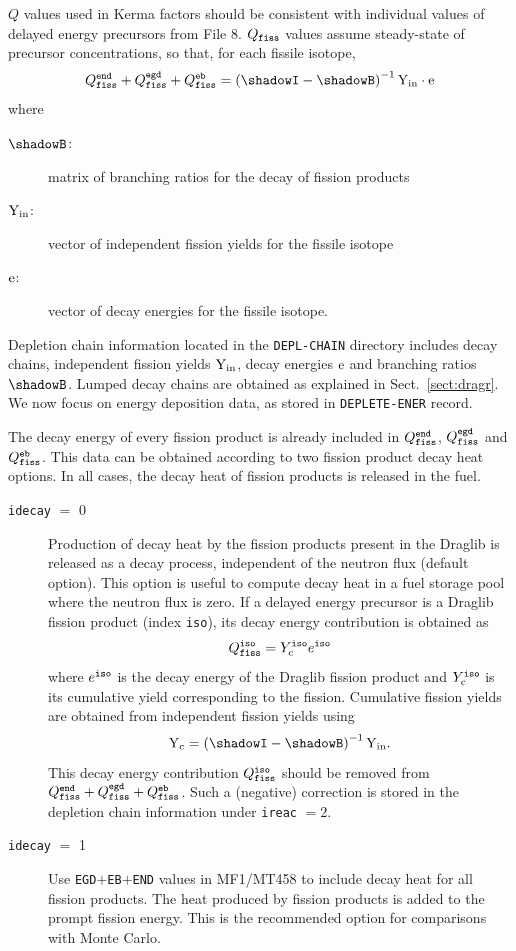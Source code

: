 $Q$ values used in Kerma factors should be consistent with individual values of
delayed energy precursors from File 8. $Q_{\tt fiss}$ values assume
steady-state of precursor concentrations, so that, for each fissile isotope,
$$Q_{\tt fiss}^{\tt end}+Q_{\tt fiss}^{\tt egd}+Q_{\tt fiss}^{\tt eb}=
\left(\shadowI-\shadowB \right)^{-1} \mbox{\boldmath Y}_{\rm in} \cdot
\mbox{\boldmath e}$$
\noindent where
\begin{description}
\item[$\shadowB$:] matrix of branching ratios for the decay of fission products
\item[$\mbox{\boldmath Y}_{\rm in}$:] vector of independent fission yields for
the fissile isotope
\item[$\mbox{\boldmath e}$:] vector of decay energies for the fissile isotope.
\end{description}

Depletion chain information located in the {\tt DEPL-CHAIN} directory includes
decay chains, independent fission yields $\mbox{\boldmath Y}_{\rm in}$, decay
energies $\mbox{\boldmath e}$ and branching ratios $\shadowB$. Lumped decay
chains are obtained as explained in Sect.~\ref{sect:dragr}. We now focus on
energy deposition data, as stored in {\tt DEPLETE-ENER} record.

The decay energy of every fission product is already included in
$Q_{\tt fiss}^{\tt end}$, $Q_{\tt fiss}^{\tt egd}$ and $Q_{\tt fiss}^{\tt eb}$.
This data can be obtained according to two fission product decay heat options.
In all cases, the decay heat of fission products is released in the fuel.

\begin{description}
\item[{\tt idecay} $=$ 0] Production of decay heat by the fission products
present in the Draglib is released as a decay process, independent of the
neutron flux (default option). This option is useful to compute decay heat
in a fuel storage pool where the neutron flux is zero. If a delayed energy
precursor is a Draglib fission product (index {\tt iso}), its decay energy
contribution is obtained as
$$
Q_{\tt fiss}^{\tt iso}=Y_{\rm c}^{\tt iso} e^{\tt iso}
$$
\noindent where $e^{\tt iso}$ is the decay energy of the Draglib fission
product and $Y_{\rm c}^{\tt iso}$ is its cumulative yield corresponding to the
fission. Cumulative fission yields are obtained from independent fission yields
using
$$
\mbox{\boldmath Y}_{\rm c} =\left(\shadowI-\shadowB \right)^{-1}
\mbox{\boldmath Y}_{\rm in} .
$$
This decay energy contribution $Q_{\tt fiss}^{\tt iso}$ should be removed from
$Q_{\tt fiss}^{\tt end}+Q_{\tt fiss}^{\tt egd}+Q_{\tt fiss}^{\tt eb}$. Such a
(negative) correction is stored in the depletion chain information under
{\tt ireac} $= 2$.

\item[{\tt idecay} $=$ 1] Use {\tt EGD}$+${\tt EB}$+${\tt END} values in
MF1/MT458 to include decay heat for all fission products. The heat produced by
fission products is added to the prompt fission energy. This is the recommended
option for comparisons with Monte Carlo.
\end{description}

